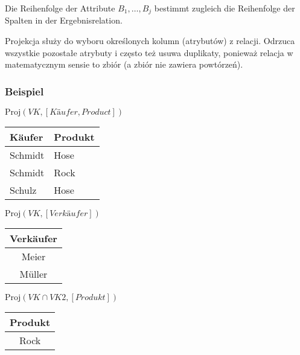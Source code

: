 Die Reihenfolge der Attribute $B_1, \dots, B_j$ bestimmt zugleich die Reihenfolge der Spalten in der Ergebnisrelation.

\begin{tcolorbox}[red, title={Hinweis}]
    Projekcja służy do wyboru określonych kolumn (atrybutów) z relacji. Odrzuca wszystkie pozostałe atrybuty i często też usuwa duplikaty, ponieważ relacja w matematycznym sensie to zbiór (a zbiór nie zawiera powtórzeń).
\end{tcolorbox}

\subsubsection{Beispiel}

\begin{table}[H]
    \centering
    \begin{minipage}{0.4\textwidth}
    \centering
    \textbf{$\text{Proj}(VK, [Käufer, Product])$} \\[3pt]
    \begin{tabularx}{\linewidth}{|X|X|}
    \hline
    Käufer & Produkt \\
    \hline
    Schmidt & Hose \\
    Schmidt & Rock \\
    Schulz & Hose \\
    \hline
    \end{tabularx}
    \end{minipage}
    \hfill
    \begin{minipage}{0.4\textwidth}
    \centering
    \textbf{$\text{Proj}(VK, [Verkäufer])$} \\[3pt]
    \begin{tabular}{|c|}
    \hline
    Verkäufer \\
    \hline
    Meier \\
    Müller \\
    \hline
    \end{tabular}
    \vspace{12pt} %

    \centering
    \textbf{$\text{Proj}(VK \cap VK2, [Produkt])$} \\[3pt]
    \begin{tabular}{|c|}
    \hline
    Produkt \\
    \hline
    Rock \\
    \hline
    \end{tabular}
    \end{minipage}
\end{table}

